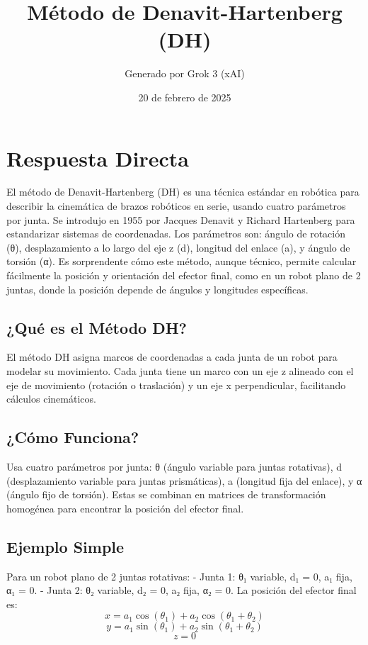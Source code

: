 \documentclass{article}%
\title{Método de Denavit{-}Hartenberg (DH)}%
\author{Generado por Grok 3 (xAI)}%
\date{20 de febrero de 2025}%
\begin{document}
%
\normalsize%
\maketitle%
\section{Respuesta Directa}%
\label{sec:RespuestaDirecta}%
El método de Denavit{-}Hartenberg (DH) es una técnica estándar en robótica para describir la cinemática de brazos robóticos en serie, usando cuatro parámetros por junta.\newline%
%
Se introdujo en 1955 por Jacques Denavit y Richard Hartenberg para estandarizar sistemas de coordenadas.\newline%
%
Los parámetros son: ángulo de rotación (θ), desplazamiento a lo largo del eje z (d), longitud del enlace (a), y ángulo de torsión (α).\newline%
%
Es sorprendente cómo este método, aunque técnico, permite calcular fácilmente la posición y orientación del efector final, como en un robot plano de 2 juntas, donde la posición depende de ángulos y longitudes específicas.\newline%
%
\subsection{¿Qué es el Método DH?}%
\label{subsec:QueselMtodoDH?}%
El método DH asigna marcos de coordenadas a cada junta de un robot para modelar su movimiento. Cada junta tiene un marco con un eje z alineado con el eje de movimiento (rotación o traslación) y un eje x perpendicular, facilitando cálculos cinemáticos.\newline%

%
\subsection{¿Cómo Funciona?}%
\label{subsec:CmoFunciona?}%
Usa cuatro parámetros por junta: θ (ángulo variable para juntas rotativas), d (desplazamiento variable para juntas prismáticas), a (longitud fija del enlace), y α (ángulo fijo de torsión). Estas se combinan en matrices de transformación homogénea para encontrar la posición del efector final.\newline%

%
\subsection{Ejemplo Simple}%
\label{subsec:EjemploSimple}%
Para un robot plano de 2 juntas rotativas:\newline%
%
{-} Junta 1: θ₁ variable, d₁ = 0, a₁ fija, α₁ = 0.\newline%
%
{-} Junta 2: θ₂ variable, d₂ = 0, a₂ fija, α₂ = 0.\newline%
%
La posición del efector final es:\newline%
%
\[%
x = a_1 \cos(\theta_1) + a_2 \cos(\theta_1 + \theta_2)%
\]%
\[%
y = a_1 \sin(\theta_1) + a_2 \sin(\theta_1 + \theta_2)%
\]%
\[%
z = 0%
\]
\end{document}
